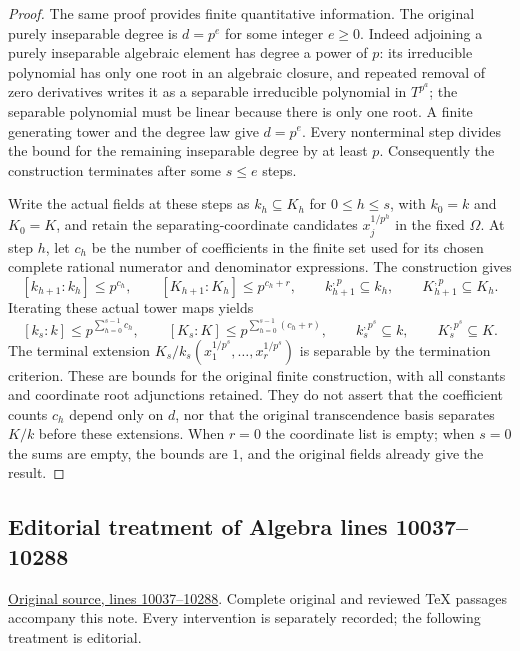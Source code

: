 \begin{proof}
\medskip\noindent
The same proof provides finite quantitative
information. The original purely inseparable
degree is $d=p^e$ for some integer $e\geq0$.
Indeed adjoining a purely inseparable algebraic
element has degree a power of $p$: its irreducible
polynomial has only one root in an algebraic
closure, and repeated removal of zero derivatives
writes it as a separable irreducible polynomial
in $T^{p^a}$; the separable polynomial must be
linear because there is only one root. A finite
generating tower and the degree law give $d=p^e$.
Every nonterminal step divides the bound for
the remaining inseparable degree by at least $p$.
Consequently the construction terminates after
some $s\leq e$ steps.

Write the actual fields at these steps as
$k_h\subseteq K_h$ for $0\leq h\leq s$,
with $k_0=k$ and $K_0=K$, and retain the
separating-coordinate candidates
$x_j^{1/p^h}$ in the fixed $\Omega$.
At step $h$, let $c_h$ be the number of
coefficients in the finite set used for its
chosen complete rational numerator and
denominator expressions. The construction gives
$$
[k_{h+1}:k_h]\leq p^{c_h},\qquad
[K_{h+1}:K_h]\leq p^{c_h+r},\qquad
k_{h+1}^{,p}\subseteq k_h,\qquad
K_{h+1}^{,p}\subseteq K_h.
$$
Iterating these actual tower maps yields
$$
[k_s:k]\leq p^{\sum_{h=0}^{s-1}c_h},\qquad
[K_s:K]\leq p^{\sum_{h=0}^{s-1}(c_h+r)},\qquad
k_s^{,p^s}\subseteq k,\qquad K_s^{,p^s}\subseteq K.
$$
The terminal extension
$K_s/k_s(x_1^{1/p^s},\ldots,x_r^{1/p^s})$
is separable by the termination criterion.
These are bounds for the original finite
construction, with all constants and coordinate
root adjunctions retained. They do not assert
that the coefficient counts $c_h$ depend only
on $d$, nor that the original transcendence
basis separates $K/k$ before these extensions.
When $r=0$ the coordinate list is empty; when
$s=0$ the sums are empty, the bounds are $1$,
and the original fields already give the result.
\end{proof}


\subsection{Editorial treatment of Algebra lines 10037--10288}

\hypertarget{algebra-context-119}{}

\noindent\href{https://github.com/stacks/stacks-project/blob/a04446e57ec1fbc252a871afcec7752fb2807b14/algebra.tex\#L10037}{Original source, lines 10037--10288}. Complete original and reviewed TeX passages accompany this note. Every intervention is separately recorded; the following treatment is editorial.


